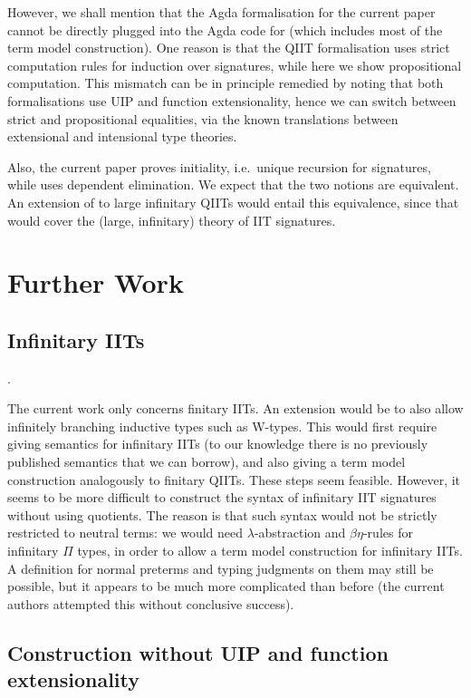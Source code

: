 \documentclass[a4paper,UKenglish,cleveref, autoref]{lipics-v2019}
\begin{document}
However, we shall mention that the Agda formalisation for the current paper
cannot be directly plugged into the Agda code for
\cite{Kaposi:2019:CQI:3302515.3290315} (which includes most of the term model
construction). One reason is that the QIIT formalisation uses strict computation
rules for induction over signatures, while here we show propositional
computation. This mismatch can be in principle remedied by noting that both
formalisations use UIP and function extensionality, hence we can switch between
strict and propositional equalities, via the known translations between
extensional and intensional type
theories\cite{hofmann95extensional,winterhalter2019eliminating}.

Also, the current paper proves initiality, i.e.\ unique recursion for
signatures, while \cite{Kaposi:2019:CQI:3302515.3290315} uses dependent
elimination. We expect that the two notions are equivalent. An extension of
\cite{Kaposi:2019:CQI:3302515.3290315} to large infinitary QIITs would entail
this equivalence, since that would cover the (large, infinitary) theory of IIT
signatures.


\section{Further Work}

\subsection{Infinitary IITs}.

The current work only concerns finitary IITs. An extension would be to also
allow infinitely branching inductive types such as W-types. This would first
require giving semantics for infinitary IITs (to our knowledge there is no
previously published semantics that we can borrow), and also giving a term model
construction analogously to finitary QIITs. These steps seem feasible. However,
it seems to be more difficult to construct the syntax of infinitary IIT
signatures without using quotients. The reason is that such syntax would not be
strictly restricted to neutral terms: we would need $\lambda$-abstraction and
$\beta\eta$-rules for infinitary $\Pi$ types, in order to allow a term model
construction for infinitary IITs. A definition for normal preterms and typing
judgments on them may still be possible, but it appears to be much more
complicated than before (the current authors attempted this without conclusive
success).

\subsection{Construction without UIP and function extensionality}



\end{document}

